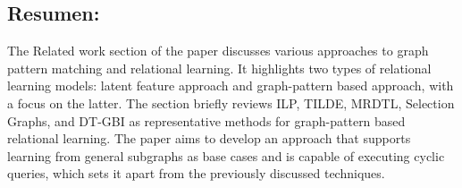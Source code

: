 \documentclass{article}%
\begin{document}
\subsection{Resumen:}%
\label{subsec:Resumen}%
 The Related work section of the paper discusses various approaches to graph pattern matching and relational learning. It highlights two types of relational learning models: latent feature approach and graph{-}pattern based approach, with a focus on the latter. The section briefly reviews ILP, TILDE, MRDTL, Selection Graphs, and DT{-}GBI as representative methods for graph{-}pattern based relational learning. The paper aims to develop an approach that supports learning from general subgraphs as base cases and is capable of executing cyclic queries, which sets it apart from the previously discussed techniques.

%
\end{document}
